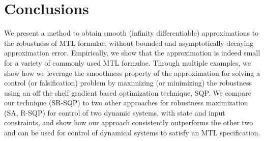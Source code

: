 \section{Conclusions}
We present a method to obtain smooth (infinity differentiable) approximations to the robustness of MTL formulae, without bounded and asymptotically decaying approximation error. Empirically, we show that the approximation is indeed small for a variety of commonly used MTL formulae. Through multiple examples, we show how we leverage the smoothness property of the approximation for solving a control (or falsification) problem by maximizing (or minimizing) the robustness using an off the shelf gradient based optimization technique, SQP. We compare our technique (SR-SQP) to two other approaches for robustness maximization (SA, R-SQP) for control of two dynamic systems, with state and input constraints, and show how our approach consistently outperforms the other two and can be used for control of dynamical systems to satisfy an MTL specification.
